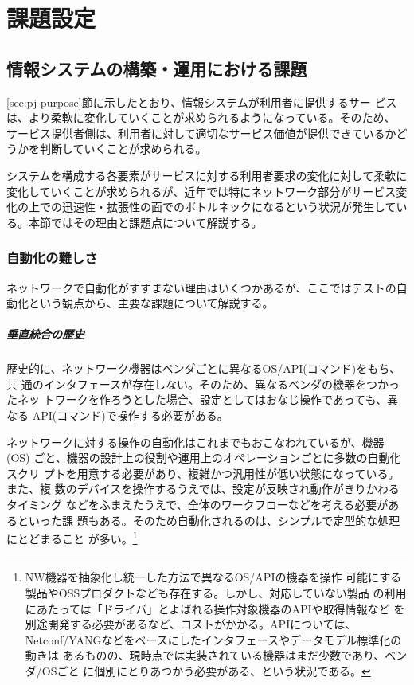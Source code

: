 
\chapter{課題設定}
\label{chap:problem-setting}

 \section{情報システムの構築・運用における課題}
 \label{sec:system-problem}

\ref{sec:pj-purpose}節に示したとおり、情報システムが利用者に提供するサー
ビスは、より柔軟に変化していくことが求められるようになっている。そのため、
サービス提供者側は、利用者に対して適切なサービス価値が提供できているかど
うかを判断していくことが求められる。

システムを構成する各要素がサービスに対する利用者要求の変化に対して柔軟に
変化していくことが求められるが、近年では特にネットワーク部分がサービス変
化の上での迅速性・拡張性の面でのボトルネックになるという状況が発生してい
る。本節ではその理由と課題点について解説する。


  \subsection{自動化の難しさ}
  \label{sec:difficulty}

ネットワークで自動化がすすまない理由はいくつかあるが、ここではテストの自
動化という観点から、主要な課題について解説する。

    \paragraph{垂直統合の歴史}
歴史的に、ネットワーク機器はベンダごとに異なるOS/API(コマンド)をもち、共
通のインタフェースが存在しない。そのため、異なるベンダの機器をつかったネッ
トワークを作ろうとした場合、設定としてはおなじ操作であっても、異なる
API(コマンド)で操作する必要がある。

ネットワークに対する操作の自動化はこれまでもおこなわれているが、機器(OS)
ごと、機器の設計上の役割や運用上のオペレーションごとに多数の自動化スクリ
プトを用意する必要があり、複雑かつ汎用性が低い状態になっている。また、複
数のデバイスを操作するうえでは、設定が反映され動作がきりかわるタイミング
などをふまえたうえで、全体のワークフローなどを考える必要があるといった課
題もある。そのため自動化されるのは、シンプルで定型的な処理にとどまること
が多い。\footnote{NW機器を抽象化し統一した方法で異なるOS/APIの機器を操作
可能にする製品やOSSプロダクトなども存在する。しかし、対応していない製品
の利用にあたっては「ドライバ」とよばれる操作対象機器のAPIや取得情報など
を別途開発する必要があるなど、コストがかかる。APIについては、
Netconf/YANGなどをベースにしたインタフェースやデータモデル標準化の動きは
あるものの、現時点では実装されている機器はまだ少数であり、ベンダ/OSごと
に個別にとりあつかう必要がある、という状況である。}

